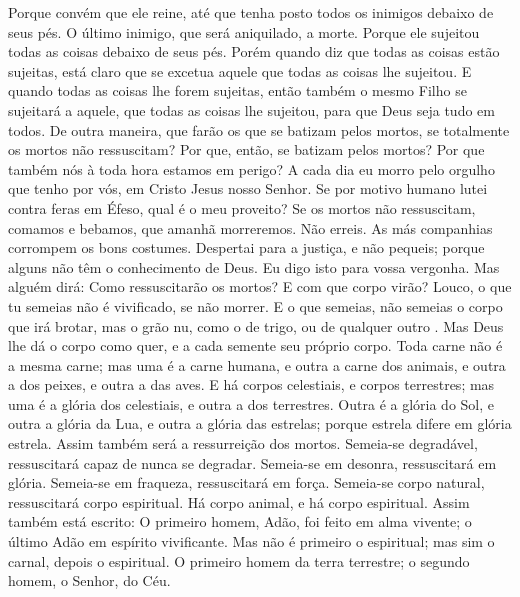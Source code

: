 {Porque convém que ele reine, até que tenha posto todos os inimigos debaixo de seus pés.
O último inimigo, que será aniquilado,
{} a morte.
Porque ele sujeitou todas as coisas debaixo de seus pés. Porém quando diz que todas as coisas
{} estão sujeitas, está claro que se excetua aquele que todas as coisas lhe sujeitou.
E quando todas as coisas lhe forem sujeitas, então também o mesmo Filho se sujeitará a aquele, que todas as coisas lhe sujeitou, para que Deus seja tudo em todos.
De outra maneira, que farão os que se batizam pelos mortos, se totalmente os mortos não ressuscitam? Por que, então, se batizam pelos mortos?
Por que também nós à toda hora estamos em perigo?
A cada dia eu morro pelo orgulho que tenho por vós, em Cristo Jesus nosso Senhor.
Se por motivo humano lutei contra feras em Éfeso, qual é o meu proveito? Se os mortos não ressuscitam, comamos e bebamos, que amanhã morreremos.
Não erreis. As más companhias corrompem os bons costumes.
Despertai para a justiça, e não pequeis; porque alguns
{} não têm o conhecimento de Deus. Eu digo isto para vossa vergonha.
Mas alguém dirá: Como ressuscitarão os mortos? E com que corpo virão?
Louco, o que tu semeias não é vivificado, se
{} não morrer.
E o que semeias, não semeias o corpo que irá brotar, mas o grão nu, como o de trigo, ou de qualquer outro
{} .
Mas Deus lhe dá o corpo como quer, e a cada semente seu próprio corpo.
Toda carne não é a mesma carne; mas uma é a carne humana, e outra a carne dos animais, e outra a dos peixes, e outra a das aves.
E há corpos celestiais, e corpos terrestres; mas uma é a glória dos celestiais, e outra a dos terrestres.
Outra é a glória do Sol, e outra a glória da Lua, e outra a glória das estrelas; porque
{} estrela difere em glória
{} estrela.
Assim também será a ressurreição dos mortos. Semeia-se
{} degradável, ressuscitará capaz de nunca se degradar.
Semeia-se em desonra, ressuscitará em glória. Semeia-se em fraqueza, ressuscitará em força.
Semeia-se corpo natural, ressuscitará corpo espiritual. Há corpo animal, e há corpo espiritual.
Assim também está escrito: O primeiro homem, Adão, foi feito em alma vivente; o último Adão em espírito vivificante.
Mas não é primeiro o espiritual; mas sim o carnal, depois o espiritual.
O primeiro homem da terra
{} terrestre; o segundo homem,
{} o Senhor,
{} do Céu.
}
